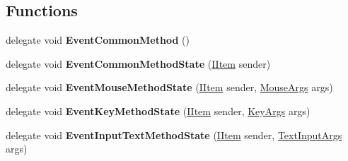 \subsection*{Functions}
\begin{DoxyCompactItemize}
\item 
\mbox{\label{namespace_space_v_i_l_a6d0f82e20b5c52982fec1b11d2e2b114}} 
delegate void {\bfseries Event\+Common\+Method} ()
\item 
\mbox{\label{namespace_space_v_i_l_a4827c261578a5d4fa3d4be8747a06105}} 
delegate void {\bfseries Event\+Common\+Method\+State} (\mbox{\hyperlink{interface_space_v_i_l_1_1_core_1_1_i_item}{I\+Item}} sender)
\item 
\mbox{\label{namespace_space_v_i_l_a8785a4bfa64a954917daa6a59703695d}} 
delegate void {\bfseries Event\+Mouse\+Method\+State} (\mbox{\hyperlink{interface_space_v_i_l_1_1_core_1_1_i_item}{I\+Item}} sender, \mbox{\hyperlink{class_space_v_i_l_1_1_core_1_1_mouse_args}{Mouse\+Args}} args)
\item 
\mbox{\label{namespace_space_v_i_l_aa06d6383a5740b3271cc5d98aae12175}} 
delegate void {\bfseries Event\+Key\+Method\+State} (\mbox{\hyperlink{interface_space_v_i_l_1_1_core_1_1_i_item}{I\+Item}} sender, \mbox{\hyperlink{class_space_v_i_l_1_1_core_1_1_key_args}{Key\+Args}} args)
\item 
\mbox{\label{namespace_space_v_i_l_afb04ede883c43fc741aa2364d76f95cb}} 
delegate void {\bfseries Event\+Input\+Text\+Method\+State} (\mbox{\hyperlink{interface_space_v_i_l_1_1_core_1_1_i_item}{I\+Item}} sender, \mbox{\hyperlink{class_space_v_i_l_1_1_core_1_1_text_input_args}{Text\+Input\+Args}} args)
\end{DoxyCompactItemize}
